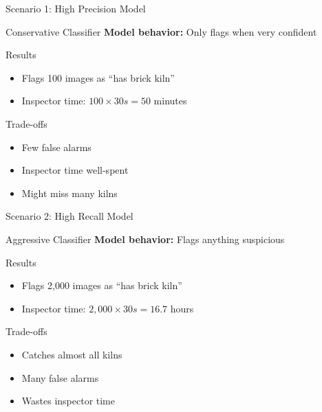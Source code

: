 \documentclass{beamer}
\begin{document}
\begin{frame}{Scenario 1: High Precision Model}
\begin{examplebox}{Conservative Classifier}
\small
\textbf{Model behavior:} Only flags when very confident
\end{examplebox}

\vspace{0.2cm}

\begin{block}{Results}
\begin{itemize}
    \item Flags 100 images as ``has brick kiln''
    \item Inspector time: $100 \times 30s = 50$ minutes
\end{itemize}
\end{block}

\vspace{0.2cm}

\begin{keypointsbox}{Trade-offs}
\small
\begin{itemize}
    \item[\textcolor{green}{\checkmark}] Few false alarms
    \item[\textcolor{green}{\checkmark}] Inspector time well-spent
    \item[\textcolor{red}{\times}] Might miss many kilns
\end{itemize}
\end{keypointsbox}
\end{frame}

\begin{frame}{Scenario 2: High Recall Model}
\begin{examplebox}{Aggressive Classifier}
\small
\textbf{Model behavior:} Flags anything suspicious
\end{examplebox}

\vspace{0.2cm}

\begin{block}{Results}
\begin{itemize}
    \item Flags 2,000 images as ``has brick kiln''
    \item Inspector time: $2{,}000 \times 30s = 16.7$ hours
\end{itemize}
\end{block}

\vspace{0.2cm}

\begin{keypointsbox}{Trade-offs}
\small
\begin{itemize}
    \item[\textcolor{green}{\checkmark}] Catches almost all kilns
    \item[\textcolor{red}{\times}] Many false alarms
    \item[\textcolor{red}{\times}] Wastes inspector time
\end{itemize}
\end{keypointsbox}
\end{frame}
\end{document}
